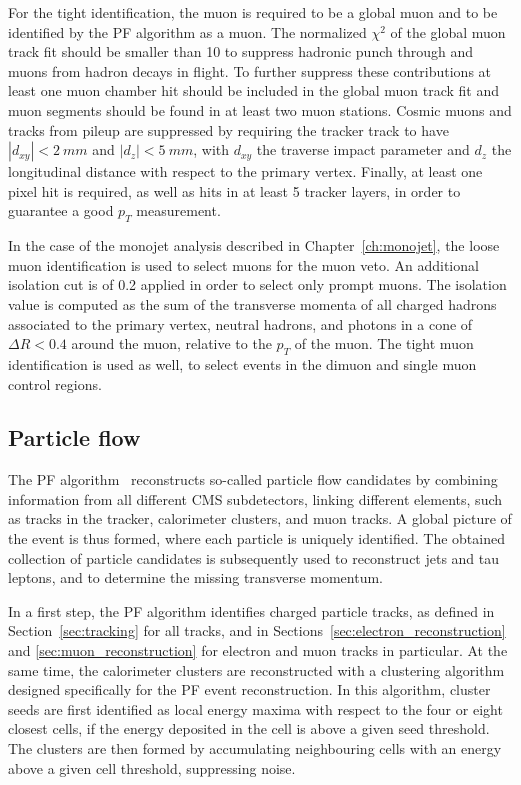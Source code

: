 For the tight identification, the muon is required to be a global muon and to be identified by the \ac{PF} algorithm as a muon. The normalized $\chi^2$ of the global muon track fit should be smaller than 10 to suppress hadronic punch through and muons from hadron decays in flight. To further suppress these contributions at least one muon chamber hit should be included in the global muon track fit and muon segments should be found in at least two muon stations. Cosmic muons and tracks from pileup are suppressed by requiring the tracker track to have $|d_{xy}| < \SI{2}{mm}$ and $|d_z| < \SI{5}{mm}$, with $d_{xy}$ the traverse impact parameter and $d_z$ the longitudinal distance with respect to the primary vertex. Finally, at least one pixel hit is required, as well as hits in at least 5 tracker layers, in order to guarantee a good $p_T$ measurement.

In the case of the monojet analysis described in Chapter~\ref{ch:monojet}, the loose muon identification is used to select muons for the muon veto. An additional isolation cut is of 0.2 applied in order to select only prompt muons. The isolation value is computed as the sum of the transverse momenta of all charged hadrons associated to the primary vertex, neutral hadrons, and photons in a cone of $\Delta R < 0.4$ around the muon, relative to the $p_T$ of the muon. The tight muon identification is used as well, to select events in the dimuon and single muon control regions. 

\subsection{Particle flow}
\label{sec:PF}

The \acf{PF} algorithm~\cite{CMS-PRF-14-001} reconstructs so-called particle flow candidates by combining information from all different \ac{CMS} subdetectors, linking different elements, such as tracks in the tracker, calorimeter clusters, and muon tracks. A global picture of the event is thus formed, where each particle is uniquely identified. The obtained collection of particle candidates is subsequently used to reconstruct jets and tau leptons, and to determine the missing transverse momentum.

In a first step, the \ac{PF} algorithm identifies charged particle tracks, as defined in Section~\ref{sec:tracking} for all tracks, and in Sections~\ref{sec:electron_reconstruction} and \ref{sec:muon_reconstruction} for electron and muon tracks in particular. At the same time, the calorimeter clusters are reconstructed with a clustering algorithm designed specifically for the \ac{PF} event reconstruction. In this algorithm, cluster seeds are first identified as local energy maxima with respect to the four or eight closest cells, if the energy deposited in the cell is above a given seed threshold. The clusters are then formed by accumulating neighbouring cells with an energy above a given cell threshold, suppressing noise.

